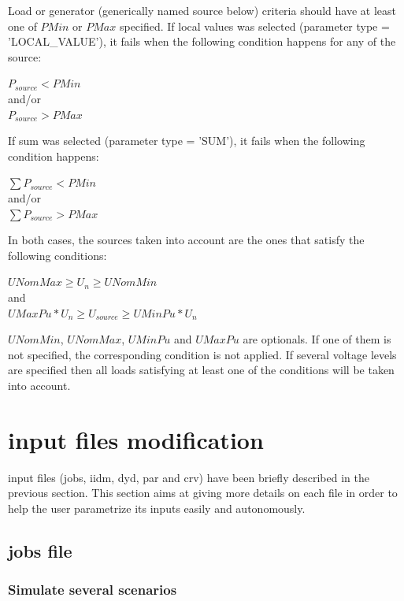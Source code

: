 \documentclass[a4paper, 12pt]{report}
\begin{document}
Load or generator (generically named source below) criteria should have at least
one of $PMin$ or $PMax$ specified.
If local values was selected  (parameter type = 'LOCAL\_VALUE'), it fails when
the following condition happens for any of the source:\\
\begin{center}
$P_{source} < PMin$\\
and/or\\
$P_{source} > PMax$\\
\end{center}
If sum was selected  (parameter type = 'SUM'), it fails when the
following condition happens: \\
\begin{center}
$\sum P_{source} < PMin$\\
and/or\\
$\sum P_{source} > PMax$ \\
\end{center}
In both cases, the sources taken into account are the ones that satisfy the
following conditions:\\
\begin{center}
$UNomMax \ge U_n \ge UNomMin$\\
and\\
$UMaxPu*U_n \ge U_{source} \ge UMinPu*U_n$ \\
\end{center}

$UNomMin$, $UNomMax$, $UMinPu$ and $UMaxPu$ are optionals. If one of them is not
specified, the corresponding condition is not applied.
If several voltage levels are specified then all loads satisfying at least one of the conditions will be taken into account.

\section[Dynawo input files modification]{\Dynawo input files modification}

\Dynawo input files (jobs, iidm, dyd, par and crv) have been briefly described in the previous section. This section aims at giving more details on each file in order to help the user parametrize its inputs easily and autonomously.

\subsection{jobs file}

\subsubsection{Simulate several scenarios}
\end{document}
